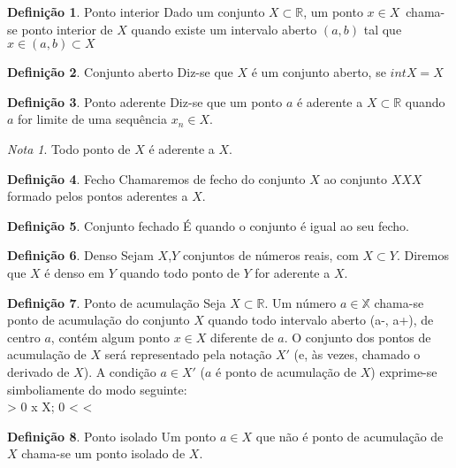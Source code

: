 \documentclass{article}
\theoremstyle{definition}
\newtheorem{definition}{Definição}
\theoremstyle{remark}
\newtheorem*{remark}{Nota}
\theoremstyle{plain}
\theoremstyle{plain}
\theoremstyle{plain}
\begin{document}
    \theoremstyle{definition}
    \begin{definition}{Ponto interior}
        Dado um conjunto  $X \subset\mathbb{R}$, um ponto $x \in X$\ chama-se ponto interior
        de $X$ quando existe um intervalo aberto $(a,b)$ tal que $x \in (a,b) \subset X$
   \end{definition}

    \begin{definition}{Conjunto aberto}
       Diz-se que $X$ é um conjunto aberto, se $int X = X$ 
    \end{definition}

    \begin{definition}{Ponto aderente}
        Diz-se que um ponto $a$ é aderente a $X \subset \mathbb{R}$
        quando $a$ for limite de uma sequência $x_n \in X$.
    \end{definition}
    \begin{remark}
        Todo ponto de $X$ é aderente a $X$.
    \end{remark}
    \begin{definition}{Fecho}
        Chamaremos de fecho do conjunto $X$ ao conjunto $XXX$ formado pelos pontos aderentes a $X$.
    \end{definition}
    \begin{definition}{Conjunto fechado}
        É quando o conjunto é igual ao seu fecho.
    \end{definition}
    \begin{definition}{Denso}
        Sejam $X$,$Y$ conjuntos de números reais, com $X \subset Y$. 
        Diremos que $X$ é denso em $Y$ quando todo ponto de $Y$ for aderente a $X$.
    \end{definition}
    \begin{definition}{Ponto de acumulação}
        Seja $X \subset \mathbb{R}$. Um número $a \in \mathbb{X}$ chama-se 
        ponto de acumulação do conjunto $X$ quando todo intervalo aberto
        (a-\epsilon, a+\epsilon), de centro $a$, contém algum ponto $x \in X$ diferente de $a$.
        O conjunto dos pontos de acumulação de $X$ será representado pela notação $X'$ (e, às vezes,
        chamado o derivado de $X$).
        A condição $a \in X'$ ($a$ é ponto de acumulação de $X$) exprime-se simboliamente do modo seguinte: \\
        \forall\epsilon > 0 \exists x \in X; 0 <  < \epsilon
    \end{definition}
    \begin{definition}{Ponto isolado}
        Um ponto $a \in X$ que não é ponto de acumulação de $X$ chama-se um ponto isolado de $X$.
    \end{definition}
\end{document}
